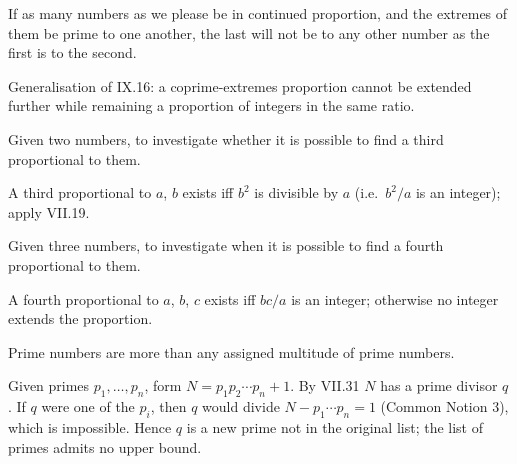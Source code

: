 \begin{claim}
\label{prop:IX.17}
If as many numbers as we please be in continued proportion, and the
extremes of them be prime to one another, the last will not be to
any other number as the first is to the second.
\end{claim}
\begin{evidence}[Proof of IX.17]
\label{ev:IX.17}
Generalisation of IX.16: a coprime-extremes proportion cannot be
extended further while remaining a proportion of integers in the
same ratio.
\end{evidence}

\begin{claim}
\label{prop:IX.18}
Given two numbers, to investigate whether it is possible to find a
third proportional to them.
\end{claim}
\begin{evidence}[Proof of IX.18]
\label{ev:IX.18}
A third proportional to $a$, $b$ exists iff $b^2$ is divisible by
$a$ (i.e.\ $b^2 / a$ is an integer); apply VII.19.
\end{evidence}

\begin{claim}
\label{prop:IX.19}
Given three numbers, to investigate when it is possible to find a
fourth proportional to them.
\end{claim}
\begin{evidence}[Proof of IX.19]
\label{ev:IX.19}
A fourth proportional to $a$, $b$, $c$ exists iff $bc / a$ is an
integer; otherwise no integer extends the proportion.
\end{evidence}

\begin{claim}
\label{prop:IX.20}
Prime numbers are more than any assigned multitude of prime numbers.
\end{claim}
\begin{evidence}[Proof of IX.20]
\label{ev:IX.20}
Given primes $p_1, \dots, p_n$, form $N = p_1 p_2 \cdots p_n + 1$.
By VII.31 $N$ has a prime divisor $q$.  If $q$ were one of the
$p_i$, then $q$ would divide $N - p_1 \cdots p_n = 1$ (Common Notion
3), which is impossible.  Hence $q$ is a new prime not in the
original list; the list of primes admits no upper bound.
\end{evidence}

